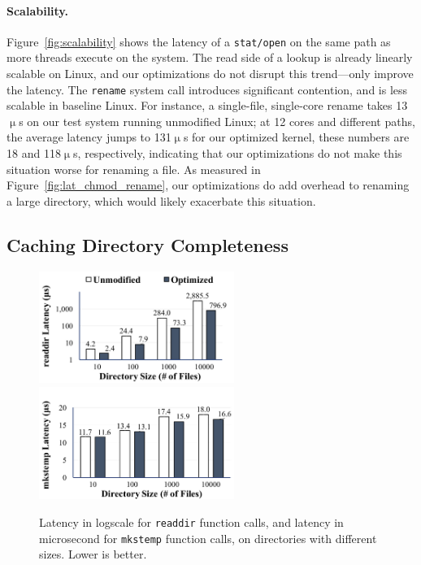 \paragraph{Scalability.}
Figure~\ref{fig:scalability} shows the latency of a {\tt stat/open} on the same path as more threads execute on the system.  
The read side of a lookup is already linearly scalable on Linux, and our optimizations do not disrupt this trend---only improve the latency.
The {\tt rename} system call introduces significant contention, and is less scalable in baseline Linux.
For instance, a single-file, single-core rename takes 13$\upmu$s 
on our test system running unmodified Linux; 
at 12 cores and different paths, the average latency jumps to 131$\upmu$s
for our optimized kernel, these numbers are 18 and 118$\upmu$s, respectively, indicating that 
our optimizations do not make this situation worse for renaming a file.
As measured in Figure~\ref{fig:lat_chmod_rename},
our optimizations do add overhead to renaming a large directory, which would likely exacerbate this situation.

\subsection{Caching Directory Completeness}

\begin{figure}
\scriptsize
\centering
\includegraphics[width=2.5in]{dcache/plots/lm_readdir.pdf}
\includegraphics[width=2.5in]{dcache/plots/lm_mkstemp.pdf}
\caption[Latency of {\tt readdir} and {\tt mkstemp} function calls.]
{Latency in logscale for {\tt readdir} function calls, and latency in microsecond for {\tt mkstemp} function calls, on directories with different sizes. Lower is better. }
\label{fig:readdir-microbench}
\end{figure}

